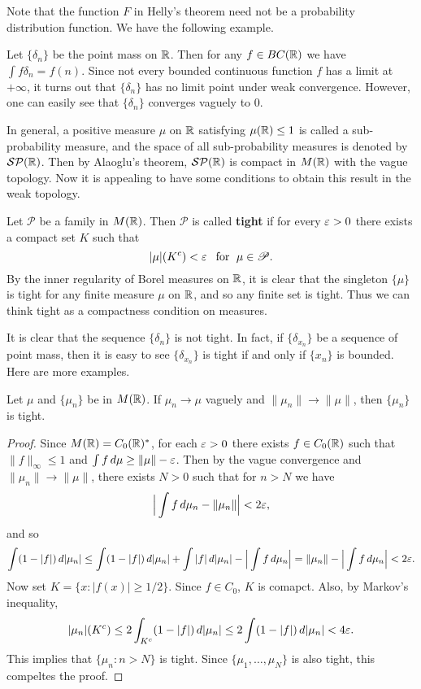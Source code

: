 Note that the function $F$ in Helly's theorem need not be a probability distribution function. We have the following example.
\begin{example}
Let $\{\delta_n\}$ be the point mass on $\mathbb{R}$. Then for any $f\in BC(\mathbb{R})$ we have $\int f\delta_n=f(n)$. Since not every bounded continuous function $f$ has a limit at $+\infty$, it turns out that $\{\delta_n\}$ has no limit point under weak convergence. However, one can easily see that $\{\delta_n\}$ converges vaguely to $0$.
\end{example}
In general, a positive measure $\mu$ on $\mathbb{R}$ satisfying $\mu(\mathbb{R})\leq 1$ is called a sub-probability measure, and the space of all sub-probability measures is denoted by $\mathcal{SP}(\mathbb{R})$. Then by Alaoglu's theorem, $\mathcal{SP}(\mathbb{R})$ is compact in $M(\mathbb{R})$ with the vague topology. Now it is appealing to have some conditions to obtain this result in the weak topology.\par
Let $\mathscr{P}$ be a family in $M(\mathbb{R})$. Then $\mathscr{P}$ is called \textbf{tight} if for every $\varepsilon>0$ there exists a compact set $K$ such that
\[|\mu|(K^c)<\varepsilon\hspace{8pt}\text{for}\hspace{6pt}\mu\in\mathscr{P}.\]
By the inner regularity of Borel measures on $\mathbb{R}$, it is clear that the singleton $\{\mu\}$ is tight for any finite measure $\mu$ on $\mathbb{R}$, and so any finite set is tight. Thus we can think tight as a compactness condition on measures.\par
It is clear that the sequence $\{\delta_n\}$ is not tight. In fact, if $\{\delta_{x_n}\}$ be a sequence of point mass, then it is easy to see $\{\delta_{x_n}\}$ is tight if and only if $\{x_n\}$ is bounded. Here are more examples.
\begin{proposition}\label{measure vague converge variation converge is tight}
Let $\mu$ and $\{\mu_n\}$ be in $M(\mathbb{R})$. If $\mu_n\to\mu$ vaguely and $\|\mu_n\|\to\|\mu\|$, then $\{\mu_n\}$ is tight.
\end{proposition}
\begin{proof}
Since $M(\mathbb{R})=C_0(\mathbb{R})^*$, for each $\varepsilon>0$ there exists $f\in C_0(\mathbb{R})$ such that $\|f\|_\infty\leq 1$ and $\int f\,d\mu\geq\|\mu\|-\varepsilon$. Then by the vague convergence and $\|\mu_n\|\to\|\mu\|$, there exists $N>0$ such that for $n>N$ we have 
\[\Big|\int f\,d\mu_n-\|\mu_n\|\Big|<2\varepsilon,\]
and so
\[\int(1-|f|)\,d|\mu_n|\leq\int(1-|f|)\,d|\mu_n|+\int|f|\,d|\mu_n|-\Big|\int f\,d\mu_n\Big|=\|\mu_n\|-\Big|\int f\,d\mu_n\Big|<2\varepsilon.\]
Now set $K=\{x:|f(x)|\geq 1/2\}$. Since $f\in C_0$, $K$ is comapct. Also, by Markov's inequality,
\[|\mu_n|(K^c)\leq 2\int_{K^c}(1-|f|)\,d|\mu_n|\leq 2\int(1-|f|)\,d|\mu_n|<4\varepsilon.\]
This implies that $\{\mu_n:n>N\}$ is tight. Since $\{\mu_1,\dots,\mu_N\}$ is also tight, this compeltes the proof.
\end{proof}
